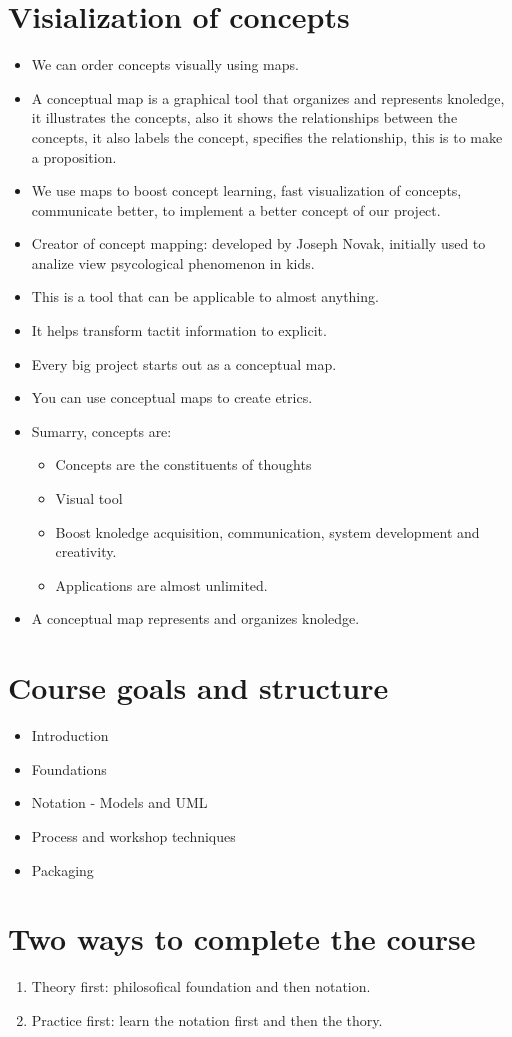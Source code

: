 \section{Visialization of concepts}
\begin{itemize}
    \item We can order concepts visually using maps.
    \item A conceptual map is a graphical tool that organizes and represents knoledge, it illustrates the concepts, also it shows the relationships between the concepts, it also labels the concept, specifies the relationship, this is to make a proposition.
    \item We use maps to boost concept learning, fast visualization of concepts, communicate better, to implement a better concept of our project.
    \item Creator of concept mapping: developed by Joseph Novak, initially used to analize view psycological phenomenon in kids.
    \item This is a tool that can be applicable to almost anything.
    \item It helps transform tactit information to explicit.
    \item Every big project starts out as a conceptual map.
    \item You can use conceptual maps to create etrics.
    \item Sumarry, concepts are:
        \begin{itemize}
            \item Concepts are the constituents of thoughts
            \item Visual tool 
            \item Boost knoledge acquisition, communication, system development and creativity.
            \item Applications are almost unlimited.
        \end{itemize}
    
    \item A conceptual map represents and organizes knoledge.
\end{itemize}


\section{Course goals and structure}
\begin{itemize}
    \item Introduction 
    \item Foundations 
    \item Notation - Models and UML 
    \item Process and workshop techniques 
    \item Packaging 
\end{itemize}


\section{Two ways to complete the course}
\begin{enumerate}
    \item Theory first: philosofical foundation and then notation.
    \item Practice first: learn the notation first and then the thory.
\end{enumerate}

